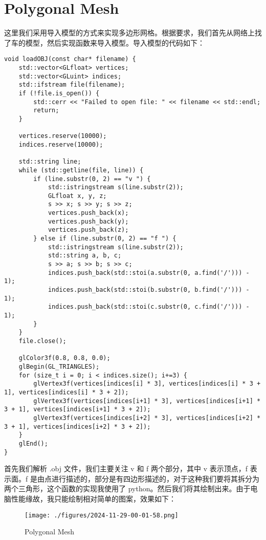\documentclass[12pt,hyperref,a4paper,UTF8]{ctexart}
\begin{document}
\section{Polygonal Mesh}
这里我们采用导入模型的方式来实现多边形网格。根据要求，我们首先从网络上找了车的模型，然后实现函数来导入模型。导入模型的代码如下：

\begin{verbatim}
void loadOBJ(const char* filename) {
    std::vector<GLfloat> vertices;
    std::vector<GLuint> indices;
    std::ifstream file(filename);
    if (!file.is_open()) {
        std::cerr << "Failed to open file: " << filename << std::endl;
        return;
    }

    vertices.reserve(10000);
    indices.reserve(10000);

    std::string line;
    while (std::getline(file, line)) {
        if (line.substr(0, 2) == "v ") {
            std::istringstream s(line.substr(2));
            GLfloat x, y, z;
            s >> x; s >> y; s >> z;
            vertices.push_back(x);
            vertices.push_back(y);
            vertices.push_back(z);
        } else if (line.substr(0, 2) == "f ") {
            std::istringstream s(line.substr(2));
            std::string a, b, c;
            s >> a; s >> b; s >> c;
            indices.push_back(std::stoi(a.substr(0, a.find('/'))) - 1);
            indices.push_back(std::stoi(b.substr(0, b.find('/'))) - 1);
            indices.push_back(std::stoi(c.substr(0, c.find('/'))) - 1);
        }
    }
    file.close();

    glColor3f(0.8, 0.8, 0.0);
    glBegin(GL_TRIANGLES);
    for (size_t i = 0; i < indices.size(); i+=3) {
        glVertex3f(vertices[indices[i] * 3], vertices[indices[i] * 3 + 1], vertices[indices[i] * 3 + 2]);
        glVertex3f(vertices[indices[i+1] * 3], vertices[indices[i+1] * 3 + 1], vertices[indices[i+1] * 3 + 2]);
        glVertex3f(vertices[indices[i+2] * 3], vertices[indices[i+2] * 3 + 1], vertices[indices[i+2] * 3 + 2]);
    }
    glEnd();
}
\end{verbatim}

首先我们解析 .obj 文件，我们主要关注 v 和 f 两个部分，其中 v 表示顶点，f 表示面。f 是由点进行描述的，部分是有四边形描述的，对于这种我们要将其拆分为两个三角形，这个函数的实现我使用了 python。然后我们将其绘制出来。由于电脑性能缘故，我只能绘制相对简单的图案，效果如下：

\begin{figure}[H]
    \centering
    \texttt{[image: ./figures/2024-11-29-00-01-58.png]}
    \caption{Polygonal Mesh}
\end{figure}
\end{document}

